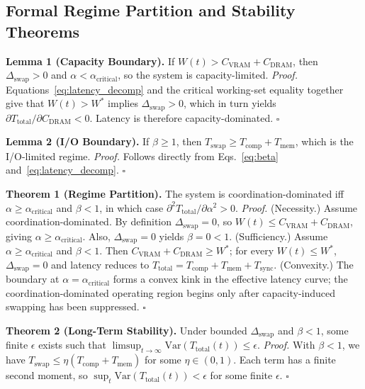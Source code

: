\subsection{Formal Regime Partition and Stability Theorems}

\textbf{Lemma 1 (Capacity Boundary).} If $W(t) > C_{\mathrm{VRAM}} + C_{\mathrm{DRAM}}$, then $\Delta_{\mathrm{swap}} > 0$ and $\alpha < \alpha_{\mathrm{critical}}$, so the system is capacity-limited. \emph{Proof.} Equations~\eqref{eq:latency_decomp} and the critical working-set equality together give that $W(t) > W^*$ implies $\Delta_{\mathrm{swap}} > 0$, which in turn yields $\partial T_{\mathrm{total}}/\partial C_{\mathrm{DRAM}} < 0$. Latency is therefore capacity-dominated. $\square$

\textbf{Lemma 2 (I/O Boundary).} If $\beta \geq 1$, then $T_{\mathrm{swap}} \geq T_{\mathrm{comp}} + T_{\mathrm{mem}}$, which is the I/O-limited regime. \emph{Proof.} Follows directly from Eqs.~\eqref{eq:beta} and~\eqref{eq:latency_decomp}. $\square$

\textbf{Theorem 1 (Regime Partition).} The system is coordination-dominated iff $\alpha \geq \alpha_{\mathrm{critical}}$ and $\beta < 1$, in which case $\partial^2 T_{\mathrm{total}}/\partial\alpha^2 > 0$. \emph{Proof.} (Necessity.) Assume coordination-dominated. By definition $\Delta_{\mathrm{swap}} = 0$, so $W(t) \leq C_{\mathrm{VRAM}} + C_{\mathrm{DRAM}}$, giving $\alpha \geq \alpha_{\mathrm{critical}}$. Also, $\Delta_{\mathrm{swap}} = 0$ yields $\beta = 0 < 1$. (Sufficiency.) Assume $\alpha \geq \alpha_{\mathrm{critical}}$ and $\beta < 1$. Then $C_{\mathrm{VRAM}} + C_{\mathrm{DRAM}} \geq W^*$; for every $W(t) \leq W^*$, $\Delta_{\mathrm{swap}} = 0$ and latency reduces to $T_{\mathrm{total}} = T_{\mathrm{comp}} + T_{\mathrm{mem}} + T_{\mathrm{sync}}$. (Convexity.) The boundary at $\alpha = \alpha_{\mathrm{critical}}$ forms a convex kink in the effective latency curve; the coordination-dominated operating region begins only after capacity-induced swapping has been suppressed. $\square$

\textbf{Theorem 2 (Long-Term Stability).} Under bounded $\Delta_{\mathrm{swap}}$ and $\beta < 1$, some finite $\epsilon$ exists such that $\limsup_{t\to\infty} \mathrm{Var}(T_{\mathrm{total}}(t)) \leq \epsilon$. \emph{Proof.} With $\beta < 1$, we have $T_{\mathrm{swap}} \leq \eta(T_{\mathrm{comp}} + T_{\mathrm{mem}})$ for some $\eta \in (0,1)$. Each term has a finite second moment, so $\sup_t \mathrm{Var}(T_{\mathrm{total}}(t)) < \epsilon$ for some finite $\epsilon$. $\square$

